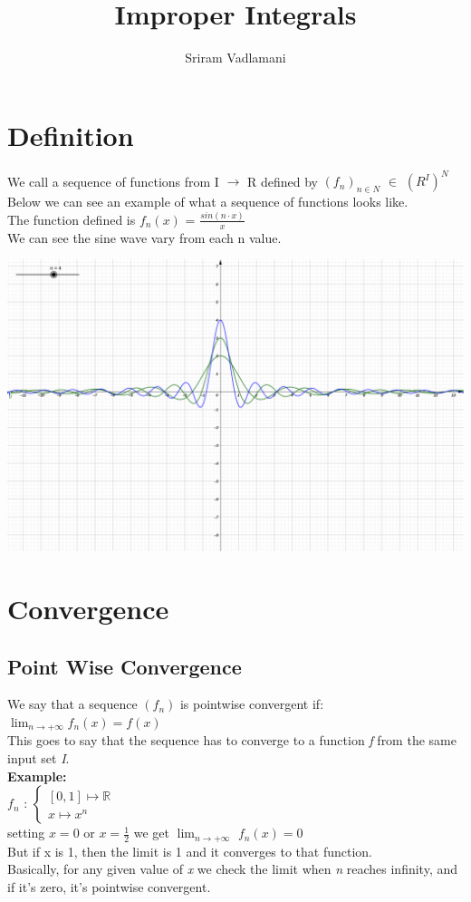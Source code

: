 \documentclass{article}
\title{Improper Integrals}
\author{Sriram Vadlamani}
\begin{document}
\maketitle
\newpage
\tableofcontents
\newpage
\section{Definition}
We call a sequence of functions from I $\rightarrow$ R defined by $(f_{n})_{n \in N}$ $\in$ $(R^{I})^{N}$\\
Below we can see an example of what a sequence of functions looks like.\\
The function defined is $f_{n} (x)$ = $ \frac{sin(n \cdot x)}{x} $ \\
We can see the sine wave vary from each n value.\\
\begin{center}
	\includegraphics[scale=0.55]{functionSequence.png}
\end{center}
\section{Convergence}
\subsection{Point Wise Convergence}
We say that a sequence $(f_{n})$ is pointwise convergent if:\\
$\displaystyle\lim_{n \to +\infty} f_{n} (x) = f(x)$\\
This goes to say that the sequence has to converge to a function \textit{f} from the same input set \textit{I}.\\
\textbf{Example:}\\
$f_{n}$ : $\left\{ \begin{array}{c}[0,1] \longmapsto \mathbb{R} \\ x \longmapsto x^{n} \end{array}\right.$\\
setting $x = 0$ or $x = \frac{1}{2}$ we get $\displaystyle\lim_{n \to +\infty}$ $f_{n} (x) = 0$\\
But if x is 1, then the limit is 1 and it converges to that function.\\
Basically, for any given value of \textit{x} we check the limit when \textit{n} reaches infinity, and if it's zero, it's pointwise convergent.\\
\end{document}
